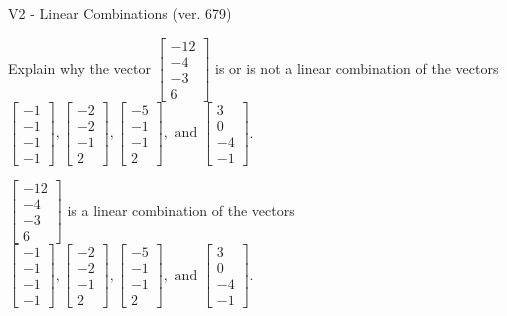\begin{exercise}
  \begin{exerciseTitle}V2 - Linear Combinations (ver. 679)\end{exerciseTitle}
  \begin{exerciseStatement}
    Explain why the vector \(\left[\begin{array}{c}
-12 \\
-4 \\
-3 \\
6
\end{array}\right]\)  is or is not a linear 
	combination of the vectors \(\left[\begin{array}{c}
-1 \\
-1 \\
-1 \\
-1
\end{array}\right] , \left[\begin{array}{c}
-2 \\
-2 \\
-1 \\
2
\end{array}\right] , \left[\begin{array}{c}
-5 \\
-1 \\
-1 \\
2
\end{array}\right] , \text{ and } \left[\begin{array}{c}
3 \\
0 \\
-4 \\
-1
\end{array}\right]\).
	


  \end{exerciseStatement}
  \begin{exerciseAnswer}
   \(\left[\begin{array}{c}
-12 \\
-4 \\
-3 \\
6
\end{array}\right]\) 
  	 is  
	a linear combination of the vectors \(\left[\begin{array}{c}
-1 \\
-1 \\
-1 \\
-1
\end{array}\right] , \left[\begin{array}{c}
-2 \\
-2 \\
-1 \\
2
\end{array}\right] , \left[\begin{array}{c}
-5 \\
-1 \\
-1 \\
2
\end{array}\right] , \text{ and } \left[\begin{array}{c}
3 \\
0 \\
-4 \\
-1
\end{array}\right]\).


\end{exerciseAnswer}
\end{exercise}
